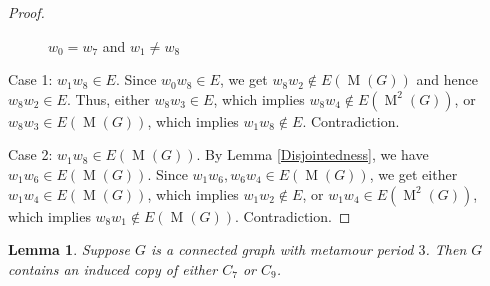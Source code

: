 \documentclass[12pt]{amsart}
\newtheorem{lemma}[theorem]{Lemma}
\theoremstyle{definition}
\theoremstyle{remark}
\numberwithin{equation}{section}
\numberwithin{figure}{section}
\newcommand{\M}{\operatorname{M}}
\begin{document}
\begin{proof}
\begin{figure}[h!]
\begin{center}
        \end{center}
    \caption{$w_0 = w_7$ and $w_1 \neq w_8$}
    \label{C_7 + 1}
    \end{figure}

    Case 1: $w_1w_8 \in E$.
    Since $w_0w_8\in E$, we get $w_8w_2 \notin E(\M(G))$ and hence $w_8w_2 \in E$. Thus, either $w_8w_3 \in E$, which implies $w_8w_4 \notin E(\M^2(G))$, or $w_8w_3 \in E(\M(G))$, which implies $w_1w_8 \notin E$. Contradiction.

    Case 2: $w_1w_8 \in E(\M(G))$.
    By Lemma \ref{Disjointedness}, we have $w_1w_6 \in E(\M(G))$. Since $w_1w_6,w_6w_4 \in E(\M(G))$, we get either $w_1w_4 \in E(\M(G))$, which implies $w_1w_2 \notin E$, or $w_1w_4 \in E(\M^2(G))$, which implies $w_8w_1 \notin E(\M(G))$. Contradiction.
\end{proof}

\begin{lemma} \label{Adjacent pairs}
    Suppose $G$ is a connected graph with metamour period $3$. Then $G$ contains an induced copy of either $C_7$ or $C_9$.
\end{lemma}
\end{document}
